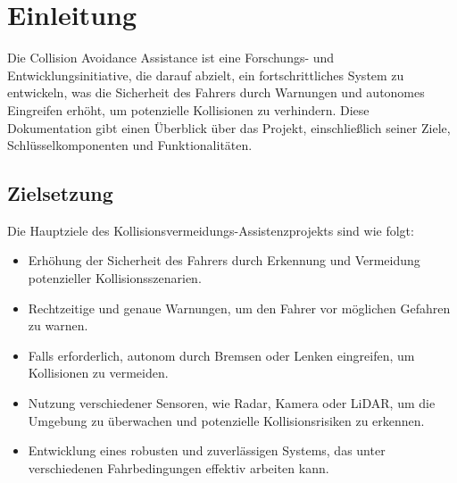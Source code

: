 \section{Einleitung}
Die Collision Avoidance Assistance ist eine Forschungs- und Entwicklungsinitiative, die darauf abzielt, ein fortschrittliches System zu entwickeln, was die Sicherheit des Fahrers durch Warnungen und autonomes Eingreifen erhöht, um potenzielle Kollisionen zu verhindern. Diese Dokumentation gibt einen Überblick über das Projekt, einschließlich seiner Ziele, Schlüsselkomponenten und Funktionalitäten.
\subsection{Zielsetzung}
Die Hauptziele des Kollisionsvermeidungs-Assistenzprojekts sind wie folgt:
\begin{itemize}
	\item Erhöhung der Sicherheit des Fahrers durch Erkennung und Vermeidung potenzieller Kollisionsszenarien.
	\item Rechtzeitige und genaue Warnungen, um den Fahrer vor möglichen Gefahren zu warnen.
	\item Falls erforderlich, autonom durch Bremsen oder Lenken eingreifen, um Kollisionen zu vermeiden.
	\item Nutzung verschiedener Sensoren, wie Radar, Kamera oder LiDAR, um die Umgebung zu überwachen und potenzielle Kollisionsrisiken zu erkennen.
	\item Entwicklung eines robusten und zuverlässigen Systems, das unter verschiedenen Fahrbedingungen effektiv arbeiten kann.
\end{itemize}
